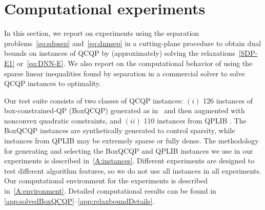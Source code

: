 \documentclass[twoside]{article}
\newcommand{\oo}[1]{{\textcolor{blue}{#1}}}
\newcommand{\red}[1]{{\textcolor{red}{#1}}}
\newcommand{\ooc}[1]{{ \oo{[OG comment: #1}]}}
\newcommand{\jim}[1]{{ \oo{[Jim comment: #1}]}}
\newcommand{\pj}[1]{{ \red{[PJ: #1]}}}
\begin{document}
		
		
		
		\section{Computational experiments}
		\label{sec:computation}
		
		In this section, we report on experiments using the separation problems~\eqref{eq:sdpsep} and~\eqref{eq:dnnsep} in a cutting-plane procedure to obtain dual bounds  on instances of QCQP by (approximately) solving the relaxations~\eqref{SDP-E1} or~\eqref{eq:DNN-E}.  We also report on the computational behavior of using the sparse linear inequalities found by separation in a commercial solver to solve QCQP instances to optimality.
		
		Our test suite consists of two classes of QCQP instances: $(i)$ 126 instances of box-constrained-QP (BoxQCQP) generated as in~\cite{burer:10} and then augmented with nonconvex quadratic constraints,
		and $(ii)$ 110 instances from QPLIB \cite{furini2019qplib}. The BoxQCQP instances are synthetically generated to control sparsity, while instances from QPLIB may be extremely sparse or fully dense. The methodology for generating and selecting the BoxQCQP and QPLIB instances we use in our experiments is described in~\ref{A:instances}.  Different experiments are designed to test different algorithm features, so we do not use all instances in all experiments.
		Our computational environment for the experiments is described in~\ref{A:environment}.
		Detailed computational results can be found in  \ref{app:solvedBoxQCQP}--\ref{app:relaxboundDetails}.
		
\end{document}
